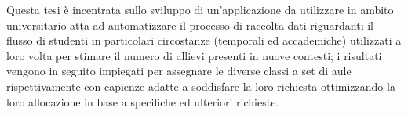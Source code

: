 \abstract
Questa tesi è incentrata sullo sviluppo di un'applicazione da utilizzare in ambito universitario 
atta ad automatizzare il processo di raccolta dati riguardanti il flusso di studenti in particolari 
circostanze (temporali ed accademiche) utilizzati a loro volta per stimare il numero di allievi presenti in 
nuove contesti; i risultati vengono in seguito impiegati per assegnare le diverse classi a set di aule 
rispettivamente con capienze adatte a soddisfare la loro richiesta ottimizzando la loro allocazione 
in base a specifiche ed ulteriori richieste.